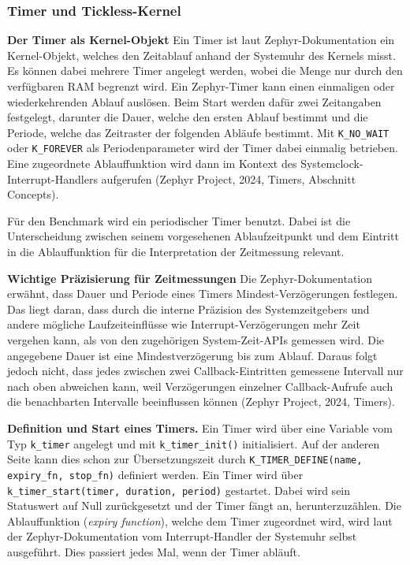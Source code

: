 \subsubsection{Timer und Tickless-Kernel}
\textbf{Der Timer als Kernel-Objekt }Ein Timer ist laut Zephyr-Dokumentation ein Kernel-Objekt, welches den Zeitablauf anhand der Systemuhr des Kernels misst. Es k{\"o}nnen dabei mehrere Timer angelegt werden, wobei die Menge nur durch den verf{\"u}gbaren RAM begrenzt wird. Ein Zephyr-Timer kann einen einmaligen oder wiederkehrenden Ablauf ausl{\"o}sen. Beim Start werden daf{\"u}r zwei Zeitangaben festgelegt, darunter die Dauer, welche den ersten Ablauf bestimmt und die Periode, welche das Zeitraster der folgenden Abl{\"a}ufe bestimmt. Mit \lstinline[style=codeinline]|K_NO_WAIT| oder \lstinline[style=codeinline]|K_FOREVER| als Periodenparameter wird der Timer dabei einmalig betrieben. Eine zugeordnete Ablauffunktion wird dann im Kontext des Systemclock-Interrupt-Handlers aufgerufen (Zephyr Project, 2024, \glqq{}Timers\grqq{}, Abschnitt \glqq{}Concepts\grqq{}).

F{\"u}r den Benchmark wird ein periodischer Timer benutzt. Dabei ist die Unterscheidung zwischen seinem vorgesehenen Ablaufzeitpunkt und dem Eintritt in die Ablauffunktion f{\"u}r die Interpretation der Zeitmessung relevant.

\textbf{Wichtige Pr{\"a}zisierung f{\"u}r Zeitmessungen }Die Zephyr-Dokumentation erw{\"a}hnt, dass Dauer und Periode eines Timers Mindest-Verz{\"o}gerungen festlegen. Das liegt daran, dass durch die interne Pr{\"a}zision des Systemzeitgebers und andere m{\"o}gliche Laufzeiteinfl{\"u}sse wie Interrupt-Verz{\"o}gerungen mehr Zeit vergehen kann, als von den zugeh{\"o}rigen System-Zeit-APIs gemessen wird. Die angegebene Dauer ist eine Mindestverz{\"o}gerung bis zum Ablauf. Daraus folgt jedoch nicht, dass jedes zwischen zwei Callback-Eintritten gemessene Intervall nur nach oben abweichen kann, weil Verz{\"o}gerungen einzelner Callback-Aufrufe auch die benachbarten Intervalle beeinflussen k{\"o}nnen (Zephyr Project, 2024, \glqq{}Timers\grqq{}).

\textbf{Definition und Start eines Timers.} Ein Timer wird {\"u}ber eine Variable vom Typ \lstinline[style=codeinline]|k_timer| angelegt und mit \lstinline[style=codeinline]|k_timer_init()| initialisiert. Auf der anderen Seite kann dies schon zur {\"U}bersetzungszeit durch \lstinline[style=codeinline]|K_TIMER_DEFINE(name, expiry_fn, stop_fn)| definiert werden. Ein Timer wird {\"u}ber \lstinline[style=codeinline]|k_timer_start(timer, duration, period)| gestartet. Dabei wird sein Statuswert auf Null zur{\"u}ckgesetzt und der Timer f{\"a}ngt an, herunterzuz{\"a}hlen. Die Ablauffunktion (\emph{expiry function}), welche dem Timer zugeordnet wird, wird laut der Zephyr-Dokumentation vom Interrupt-Handler der Systemuhr selbst ausgef{\"u}hrt. Dies passiert jedes Mal, wenn der Timer abl{\"a}uft.

